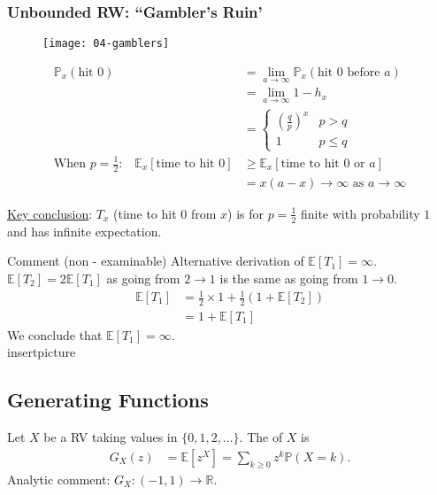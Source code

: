\subsubsection{Unbounded RW: ``Gambler's Ruin'}

\begin{figure}[h] 
    \centering 
    \texttt{[image: 04-gamblers]} 
\end{figure}

\begin{align*}
    \mathbb{P}_x(\text{hit } 0) &= \lim_{a \to \infty} \mathbb{P}_x(\text{hit $0$ before $a$}) \\
    &= \lim_{a \to \infty} 1 - h_x \\
    &= \begin{cases}
        (\frac{q}{p})^x & p > q \\
        1 & p \leq q
    \end{cases} \\
    \text{When $p = \frac{1}{2}$:} \quad \mathbb{E}_x[\text{time to hit } 0] &\geq \mathbb{E}_x[\text{time to hit $0$ or $a$}] \\
    &= x(a-x) \to \infty \text{ as } a \to \infty
\end{align*} 

\underline{Key conclusion}: $T_x$ (time to hit $0$ from $x$) is for $p = \frac{1}{2}$ finite with probability $1$ and has infinite expectation.

\begin{aside}{Comment (non - examinable)}
    Alternative derivation of $\mathbb{E}[T_1] = \infty$. \\
    $\mathbb{E}[T_2] = 2 \mathbb{E}[T_1]$ as going from $2 \to 1$ is the same as going from $1 \to 0$.
    \begin{align*}
        \mathbb{E}[T_1] &= \frac{1}{2} \times 1 + \frac{1}{2} \left( 1 + \mathbb{E}[T_2] \right) \\
        &= 1 + \mathbb{E}[T_1]
    \end{align*} 
    We conclude that $\mathbb{E}[T_1] = \infty$. \\
    insertpicture
\end{aside} 

\subsection{Generating Functions}

\begin{definition}
    Let $X$ be a RV taking values in $\{0, 1, 2, \dots\}$. The  of $X$ is 
    \begin{align*}
        G_X(z) &= \mathbb{E}\left[ z^X \right] = \sum_{k \geq 0} z^k \mathbb{P}(X = k). 
    \end{align*} 
    Analytic comment: $G_X : (-1, 1) \to \mathbb{R}$.
\end{definition} 

